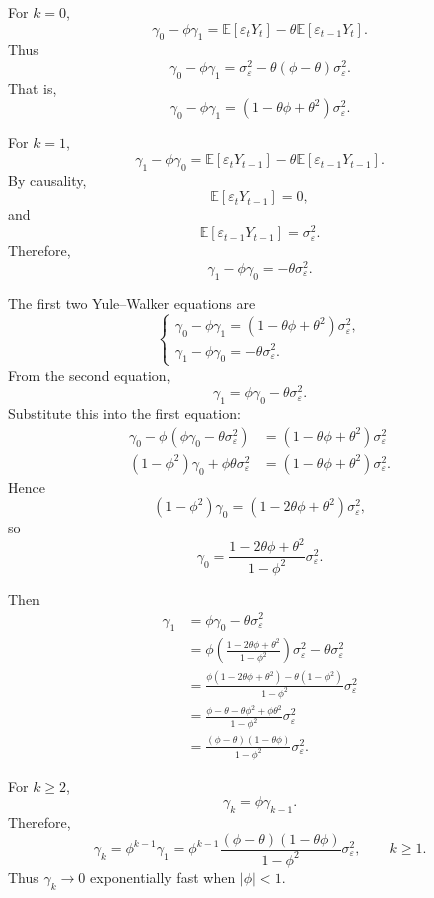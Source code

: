 \documentclass[12pt,oneside]{book}
\numberwithin{equation}{section}
\theoremstyle{definition}
\theoremstyle{plain}
\theoremstyle{remark}
\newcommand{\E}{\mathbb{E}}
\begin{document}
For $k=0$,
\[
\gamma_0-\phi\gamma_1
=
\E[\varepsilon_tY_t]
-
\theta\E[\varepsilon_{t-1}Y_t].
\]
Thus
\[
\gamma_0-\phi\gamma_1
=
\sigma_\varepsilon^2
-
\theta(\phi-\theta)\sigma_\varepsilon^2.
\]
That is,
\[
\gamma_0-\phi\gamma_1
=
(1-\theta\phi+\theta^2)\sigma_\varepsilon^2.
\]

For $k=1$,
\[
\gamma_1-\phi\gamma_0
=
\E[\varepsilon_tY_{t-1}]
-
\theta\E[\varepsilon_{t-1}Y_{t-1}].
\]
By causality,
\[
\E[\varepsilon_tY_{t-1}]=0,
\]
and
\[
\E[\varepsilon_{t-1}Y_{t-1}]=\sigma_\varepsilon^2.
\]
Therefore,
\[
\gamma_1-\phi\gamma_0
=
-\theta\sigma_\varepsilon^2.
\]

The first two Yule--Walker equations are
\[
\begin{cases}
\gamma_0-\phi\gamma_1=(1-\theta\phi+\theta^2)\sigma_\varepsilon^2,\\
\gamma_1-\phi\gamma_0=-\theta\sigma_\varepsilon^2.
\end{cases}
\]
From the second equation,
\[
\gamma_1=\phi\gamma_0-\theta\sigma_\varepsilon^2.
\]
Substitute this into the first equation:
\begin{align*}
\gamma_0-\phi(\phi\gamma_0-\theta\sigma_\varepsilon^2)
&=
(1-\theta\phi+\theta^2)\sigma_\varepsilon^2 \\
(1-\phi^2)\gamma_0+\phi\theta\sigma_\varepsilon^2
&=
(1-\theta\phi+\theta^2)\sigma_\varepsilon^2.
\end{align*}
Hence
\[
(1-\phi^2)\gamma_0
=
(1-2\theta\phi+\theta^2)\sigma_\varepsilon^2,
\]
so
\[
\gamma_0
=
\frac{1-2\theta\phi+\theta^2}{1-\phi^2}\sigma_\varepsilon^2.
\]

Then
\begin{align*}
\gamma_1
&=
\phi\gamma_0-\theta\sigma_\varepsilon^2 \\
&=
\phi
\left(
\frac{1-2\theta\phi+\theta^2}{1-\phi^2}
\right)\sigma_\varepsilon^2
-
\theta\sigma_\varepsilon^2 \\
&=
\frac{\phi(1-2\theta\phi+\theta^2)-\theta(1-\phi^2)}{1-\phi^2}\sigma_\varepsilon^2 \\
&=
\frac{\phi-\theta-\theta\phi^2+\phi\theta^2}{1-\phi^2}\sigma_\varepsilon^2 \\
&=
\frac{(\phi-\theta)(1-\theta\phi)}{1-\phi^2}\sigma_\varepsilon^2.
\end{align*}

For $k\geq 2$,
\[
\gamma_k=\phi\gamma_{k-1}.
\]
Therefore,
\[
\gamma_k
=
\phi^{k-1}\gamma_1
=
\phi^{k-1}
\frac{(\phi-\theta)(1-\theta\phi)}{1-\phi^2}
\sigma_\varepsilon^2,
\qquad k\geq 1.
\]
Thus $\gamma_k\to 0$ exponentially fast when $|\phi|<1$.
\end{document}
